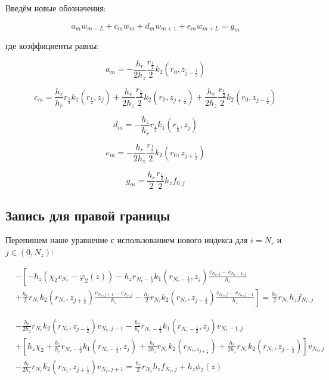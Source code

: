 Введём новые обозначения:

\[
  a_m w_{m - L} + c_m w_m + d_m w_{m + 1} + e_m w_{m + L} = g_m
\]

где коэффициенты равны:

\[
  a_m = - \frac{h_r}{2 h_z} \frac{r_{\frac{1}{2}}}{2} k_2(r_0, z_{j - \frac{1}{2}})
\]

\[
  c_m = \frac{h_z}{h_r} r_{\frac{1}{2}} k_1(r_{\frac{1}{2}}, z_j) + \frac{h_r}{2 h_z} \frac{r_{\frac{1}{2}}}{2} k_2(r_0, z_{j+\frac{1}{2}})
  + \frac{h_r}{2 h_z} \frac{r_{\frac{1}{2}}}{2} k_2(r_0, z_{j -\frac{1}{2}})
\]

\[
  d_m = - \frac{h_z}{h_r} r_{\frac{1}{2}} k_1(r_{\frac{1}{2}}, z_j)
\]

\[
  e_m = - \frac{h_r}{2 h_z} \frac{r_{\frac{1}{2}}}{2} k_2(r_0, z_{j + \frac{1}{2}})
\]

\[
  g_m = \frac{h_r}{2} \frac{r_{\frac{1}{2}}}{2} h_z f_{0, j}
\]

\subsection{Запись для правой границы}
Перепишем наше уравнение с использованием нового индекса для $i = N_r$ и $ j \in (0, N_z) $:

\begin{align*}
  &- \left [ 
  -h_z ( \chi_2 v_{N_r} - \varphi_2(z))
  - h_z r_{N_r-\frac{1}{2}} k_1(r_{N_r-\frac{1}{2}}, z_j) \frac{v_{N_r, j} - v_{N_r - 1, j}}{h_{r}}
  \right . \\
  &\left .
  + \frac{h_r}{2} r_{N_r} k_2(r_{N_r}, z_{j+\frac{1}{2}}) \frac{v_{N_r, j + 1} - v_{N_r, j}}{h_{z}}
  - \frac{h_r}{2} r_{N_r} k_2(r_{N_r}, z_{j-\frac{1}{2}}) \frac{v_{N_r, j} - v_{N_r, j - 1}}{h_z}
  \right ]  = \frac{h_r}{2} r_{N_r} h_z f_{N_r, j}
\end{align*}

\begin{align*}
  & - \frac{h_r}{2h_z} r_{N_r} k_2(r_{N_r}, z_{j - \frac{1}{2}}) v_{N_r, j - 1}
  - \frac{h_z}{h_r} r_{N_r - \frac{1}{2}} k_1(r_{N_r - \frac{1}{2}}, z_j) v_{N_r - 1, j} \\
  & +\left[
    h_z\chi_2  + \frac{h_z}{h_r} r_{N_r - \frac{1}{2}} k_1(r_{N_r -\frac{1}{2}}, z_j)
    + \frac{h_r}{2 h_z} r_{N_r} k_2(r_{N_r, z_{j + \frac{1}{2}}})
    + \frac{h_r}{2 h_z} r_{N_r} k_2 (r_{N_r}, z_{j - \frac{1}{2}})
  \right] v_{N_r, j} \\
  &- \frac{h_r}{2 h_z} r_{N_r} k_2(r_{N_r}, z_{j + \frac{1}{2}}) v_{N_r, j + 1}
  = \frac{h_r}{2} r_{N_r} h_z f_{N_r, j} + h_z\phi_2(z)
\end{align*}

